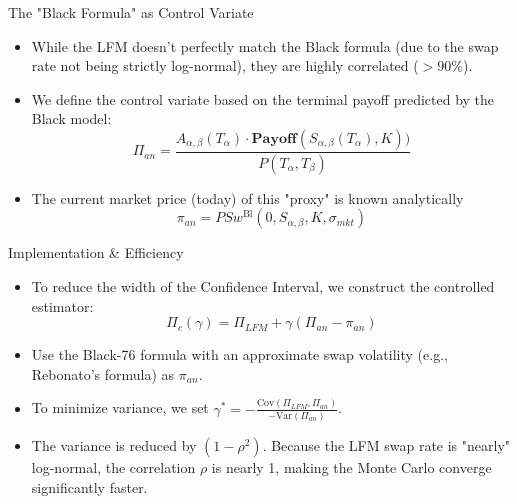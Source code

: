 \documentclass{beamer}
\begin{document}
\begin{frame}{The "Black Formula" as Control Variate}
	\begin{itemize}
		\item While the LFM doesn't perfectly match the Black formula (due to the swap rate not being strictly log-normal), they are highly correlated ($>90\%$).
		\item We define the control variate based on the terminal payoff predicted by the Black model:
		\begin{equation*}
			\Pi_{an} = \frac{A_{\alpha,\beta}(T_\alpha)\cdot\textbf{Payoff}(S_{\alpha,\beta}(T_\alpha),K))}{P(T_\alpha, T_\beta)}
		\end{equation*}
		\item The current market price (today) of this "proxy" is known analytically
		\begin{equation*}
			\pi_{an}=PSw^{\text{Bl}}(0, S_{\alpha,\beta}, K, \sigma_{mkt})
		\end{equation*}
	\end{itemize}
\end{frame}

\begin{frame}{Implementation \& Efficiency}
	\begin{itemize}
		\item To reduce the width of the Confidence Interval, we construct the controlled estimator:
		\begin{equation*}
			\Pi_c(\gamma) = \Pi_{LFM} + \gamma(\Pi_{an} - \pi_{an})
		\end{equation*}
		\item Use the Black-76 formula with an approximate swap volatility (e.g., Rebonato’s formula) as $\pi_{an}$.
		\item To minimize variance, we set $\gamma^*=-\frac{\text{Cov}(\Pi_{LFM}, \Pi_{an})}{-\text{Var}(\Pi_{an})}$. %
		\item The variance is reduced by $(1-\rho^2)$. Because the LFM swap rate is "nearly" log-normal, the correlation $\rho$ is nearly 1, making the Monte Carlo converge significantly faster.
	\end{itemize}
\end{frame}
\end{document}
